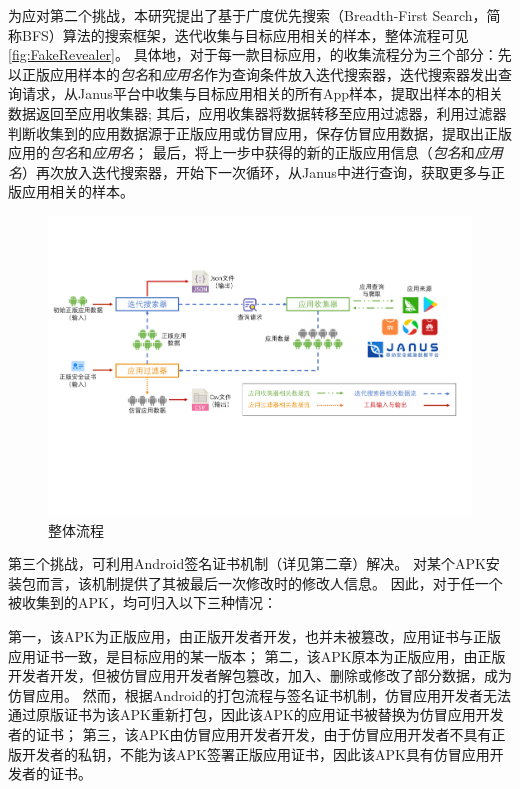 为应对第二个挑战，本研究提出了基于广度优先搜索（Breadth-First Search，简称BFS）算法的搜索框架\mytool，迭代收集与目标应用相关的样本，整体流程可见\autoref{fig:FakeRevealer}。
具体地，对于每一款目标应用，\mytool 的收集流程分为三个部分：先以正版应用样本的\emph{包名}和\emph{应用名}作为查询条件放入迭代搜索器，迭代搜索器发出查询请求，从Janus平台中收集与目标应用相关的所有App样本，提取出样本的相关数据返回至应用收集器;
其后，应用收集器将数据转移至应用过滤器，利用过滤器判断收集到的应用数据源于正版应用或仿冒应用，保存仿冒应用数据，提取出正版应用的\emph{包名}和\emph{应用名}；
最后，将上一步中获得的新的正版应用信息（\emph{包名}和\emph{应用名}）再次放入迭代搜索器，开始下一次循环，从Janus中进行查询，获取更多与正版应用相关的样本。

\begin{figure}[htbp]
	\centering
	\includegraphics[width=\textwidth]{./Figures/edwin-fakerevealer}
	\caption{\mytool 整体流程}
	\label{fig:FakeRevealer}
	\vspace{-3mm}
\end{figure}

第三个挑战，可利用Android签名证书机制（详见第二章）解决。
对某个APK安装包而言，该机制提供了其被最后一次修改时的修改人信息。
因此，对于任一个被\mytool 收集到的APK，均可归入以下三种情况：

第一，该APK为正版应用，由正版开发者开发，也并未被篡改，应用证书与正版应用证书一致，是目标应用的某一版本；
第二，该APK原本为正版应用，由正版开发者开发，但被仿冒应用开发者解包篡改，加入、删除或修改了部分数据，成为仿冒应用。
然而，根据Android的打包流程与签名证书机制，仿冒应用开发者无法通过原版证书为该APK重新打包，因此该APK的应用证书被替换为仿冒应用开发者的证书；
第三，该APK由仿冒应用开发者开发，由于仿冒应用开发者不具有正版开发者的私钥，不能为该APK签署正版应用证书，因此该APK具有仿冒应用开发者的证书。

